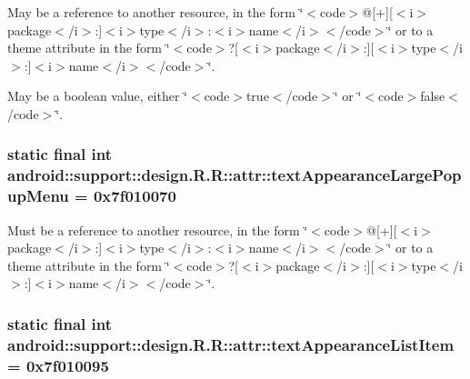 May be a reference to another resource, in the form \char`\"{}$<$code$>$@\mbox{[}+\mbox{]}\mbox{[}$<$i$>$package$<$/i$>$:\mbox{]}$<$i$>$type$<$/i$>$:$<$i$>$name$<$/i$>$$<$/code$>$\char`\"{} or to a theme attribute in the form \char`\"{}$<$code$>$?\mbox{[}$<$i$>$package$<$/i$>$:\mbox{]}\mbox{[}$<$i$>$type$<$/i$>$:\mbox{]}$<$i$>$name$<$/i$>$$<$/code$>$\char`\"{}. 

May be a boolean value, either \char`\"{}$<$code$>$true$<$/code$>$\char`\"{} or \char`\"{}$<$code$>$false$<$/code$>$\char`\"{}. \hypertarget{classandroid_1_1support_1_1design_1_1_r_1_1attr_589aecb7fe2ace1f8cca37f52db3a8ff}{
\subsubsection[{textAppearanceLargePopupMenu}]{\setlength{\rightskip}{0pt plus 5cm}static final int android::support::design.R.R::attr::textAppearanceLargePopupMenu = 0x7f010070}}
\label{classandroid_1_1support_1_1design_1_1_r_1_1attr_589aecb7fe2ace1f8cca37f52db3a8ff}


Must be a reference to another resource, in the form \char`\"{}$<$code$>$@\mbox{[}+\mbox{]}\mbox{[}$<$i$>$package$<$/i$>$:\mbox{]}$<$i$>$type$<$/i$>$:$<$i$>$name$<$/i$>$$<$/code$>$\char`\"{} or to a theme attribute in the form \char`\"{}$<$code$>$?\mbox{[}$<$i$>$package$<$/i$>$:\mbox{]}\mbox{[}$<$i$>$type$<$/i$>$:\mbox{]}$<$i$>$name$<$/i$>$$<$/code$>$\char`\"{}. \hypertarget{classandroid_1_1support_1_1design_1_1_r_1_1attr_76cadee511aac695121be7ea00c6abfc}{
\subsubsection[{textAppearanceListItem}]{\setlength{\rightskip}{0pt plus 5cm}static final int android::support::design.R.R::attr::textAppearanceListItem = 0x7f010095}}
\label{classandroid_1_1support_1_1design_1_1_r_1_1attr_76cadee511aac695121be7ea00c6abfc}


